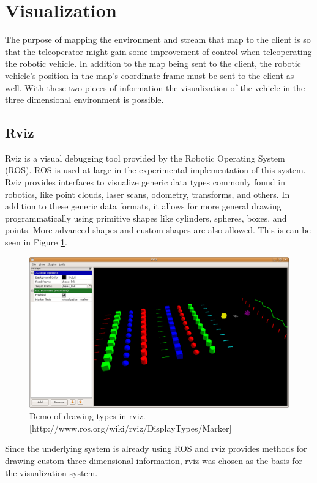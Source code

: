 \documentclass[12pt]{report}
\begin{document}
\section{Visualization}
The purpose of mapping the environment and stream that map to the client is so that the teleoperator might gain some improvement of control when teleoperating the robotic vehicle.  In addition to the map being sent to the client, the robotic vehicle's position in the map's coordinate frame must be sent to the client as well.  With these two pieces of information the visualization of the vehicle in the three dimensional environment is possible.

\subsection{Rviz}
Rviz\cite{rviz} is a visual debugging tool provided by the Robotic Operating System (ROS)\cite{quigley2009ros}.  ROS is used at large in the experimental implementation of this system.  Rviz provides interfaces to visualize generic data types commonly found in robotics, like point clouds, laser scans, odometry, transforms, and others.  In addition to these generic data formats, it allows for more general drawing programmatically using primitive shapes like cylinders, spheres, boxes, and points.  More advanced shapes and custom shapes are also allowed.  This is can be seen in Figure \ref{fig:rviz_shapes}.

\begin{figure}[ht]
  \centering
  \includegraphics[width=6.5in,keepaspectratio]{rviz_shapes.png}
  \caption{Demo of drawing types in rviz. [http://www.ros.org/wiki/rviz/DisplayTypes/Marker]}
  \label{fig:rviz_shapes}
\end{figure}

Since the underlying system is already using ROS and rviz provides methods for drawing custom three dimensional information, rviz was chosen as the basis for the visualization system.
\end{document}
